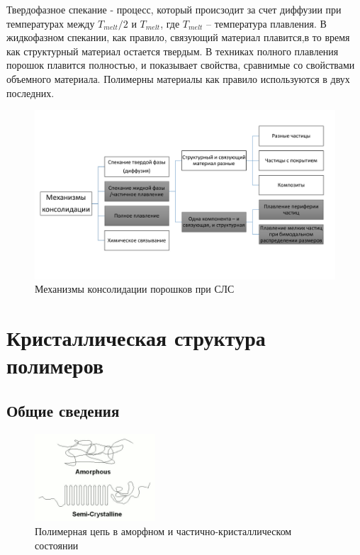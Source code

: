 Твердофазное спекание - процесс, который происзодит за счет диффузии при температурах между $T_{melt}/2$ и $T_{melt}$, где $T_{melt}$ -- температура плавления. В жидкофазном спекании, как правило, связующий материал  плавится,в то время как структурный материал остается твердым. В техниках полного плавления порошок плавится полностью, и показывает свойства, сравнимые со свойствами объемного материала. Полимерны материалы как правило используются в двух последних.



\begin{figure}[h]
    \centering
    \includegraphics[width = \linewidth]{fig/mecha.pdf}
    \caption{Механизмы консолидации порошков при СЛС}
    \label{fig:binding}
\end{figure}

\section{Кристаллическая структура полимеров}

\subsection{Общие сведения}

	\begin{figure} 
\vspace{-20pt}


  \begin{center}
    \includegraphics[width=0.4\textwidth]{fig/crystal-1.png}
    \caption{Полимерная цепь в аморфном и частично-кристаллическом состоянии}
    \label{fig:crystal-1}
  \end{center}
  \vspace{-20pt}
  \vspace{1pt}
\end{figure}


